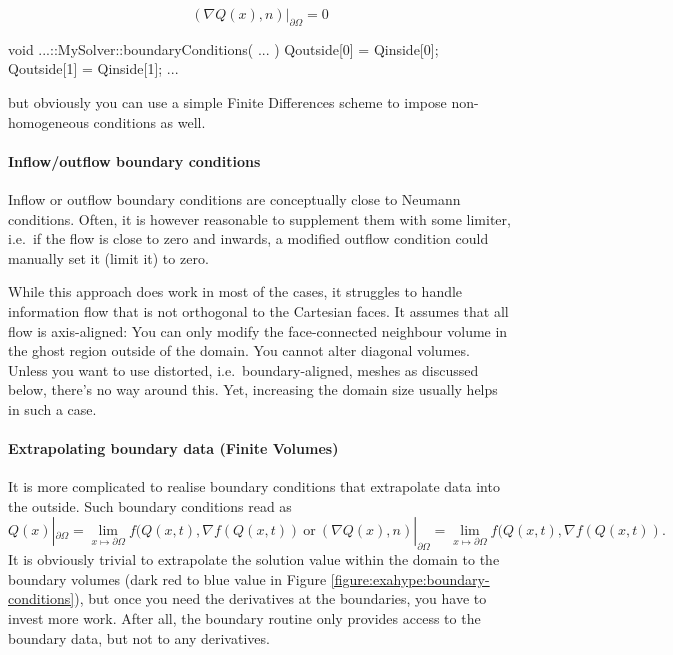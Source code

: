 \[
  \left( \nabla Q(x), n \right)  | _{\partial \Omega } = 0
\]


\begin{code}
void ...::MySolver::boundaryConditions(
  ...
) {
  Qoutside[0] = Qinside[0];
  Qoutside[1] = Qinside[1];
  ...
}
\end{code}

\noindent
but obviously you can use a simple Finite Differences scheme to impose
non-homogeneous conditions as well.



\paragraph{Inflow/outflow boundary conditions}

Inflow or outflow boundary conditions are conceptually close to Neumann
conditions. 
Often, it is however reasonable to supplement them with some limiter, i.e.~if
the flow is close to zero and inwards, a modified outflow condition could
manually set it (limit it) to zero.


While this approach does work in most of the cases, it struggles to handle
information flow that is not orthogonal to the Cartesian faces.
It assumes that all flow is axis-aligned:
You can only modify the face-connected neighbour volume in the ghost 
region outside of the domain.
You cannot alter diagonal volumes.
Unless you want to use distorted, i.e.~boundary-aligned, meshes as discussed
below, there's no way around this.
Yet, increasing the domain size usually helps in such a case.




\paragraph{Extrapolating boundary data (Finite Volumes)}



It is more complicated to realise boundary conditions that extrapolate
data into the outside.
Such boundary conditions read as
\[
  Q(x) | _{\partial \Omega } = \lim _{x \mapsto \partial \Omega}
  f(Q(x,t),\nabla f(Q(x,t))
  \ \text{or} \
  \left( \nabla Q(x), n \right) | _{\partial \Omega } = \lim _{x \mapsto
  \partial \Omega} f(Q(x,t),\nabla f(Q(x,t)).
\]
It is obviously trivial to extrapolate the solution value within the domain to
the boundary volumes (dark red to blue value in Figure
\ref{figure:exahype:boundary-conditions}), but once you need the derivatives at
the boundaries, you have to invest more work.
After all, the boundary routine only provides access to the boundary data, but
not to any derivatives.


